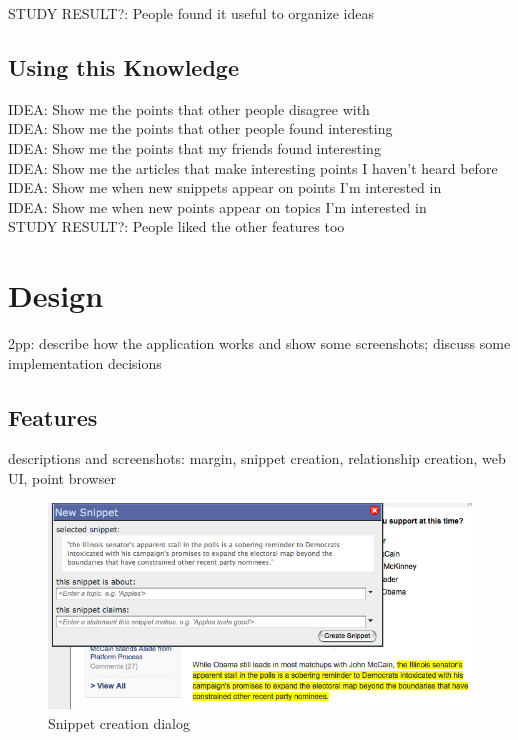 \documentclass{sig-alt-release2}
\newcommand{\idea}[1]{{\color{blue} IDEA: #1}\\}
\newcommand{\studyresult}[1]{{\color{red} STUDY RESULT?: #1}\\}
\begin{document}
\studyresult{People found it useful to organize ideas}




\subsection{Using this Knowledge}

\idea{Show me the points that other people disagree with}

\idea{Show me the points that other people found interesting}

\idea{Show me the points that my friends found interesting}


\idea{Show me the articles that make interesting points I haven't heard before}

\idea{Show me when new snippets appear on points I'm interested in}

\idea{Show me when new points appear on topics I'm interested in}



\studyresult{People liked the other features too}

\section{Design}
2pp: describe how the application works and show some screenshots; discuss some implementation decisions
\subsection{Features}
descriptions and screenshots: margin, snippet creation, relationship creation, web UI, point browser
\begin{figure}[ht]
	\includegraphics[scale=0.35]{../screenshots/snippetdialog_sm.jpg}
	\caption{Snippet creation dialog}
	\label{snippetdialog}
\end{figure}
\end{document}
